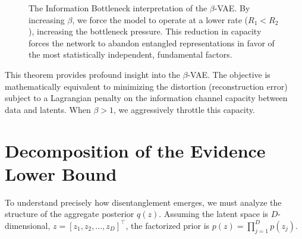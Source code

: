 \begin{figure}[htbp]
    \centering
    \caption{The Information Bottleneck interpretation of the $\beta$-VAE. By increasing $\beta$, we force the model to operate at a lower rate ($R_1 < R_2$), increasing the bottleneck pressure. This reduction in capacity forces the network to abandon entangled representations in favor of the most statistically independent, fundamental factors.}
    \label{fig:beta_vae_tradeoff}
\end{figure}

This theorem provides profound insight into the $\beta$-VAE. The objective is mathematically equivalent to minimizing the distortion (reconstruction error) subject to a Lagrangian penalty on the information channel capacity between data and latents. When $\beta > 1$, we aggressively throttle this capacity.

\section{Decomposition of the Evidence Lower Bound}

To understand precisely how disentanglement emerges, we must analyze the structure of the aggregate posterior $q(z)$. Assuming the latent space is $D$-dimensional, $z = [z_1, z_2, \dots, z_D]^\top$, the factorized prior is $p(z) = \prod_{j=1}^D p(z_j)$.

